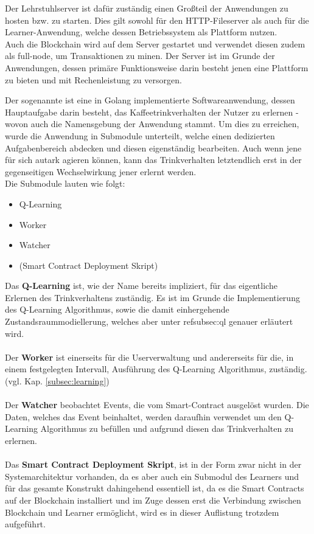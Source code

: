 Der Lehrstuhlserver ist dafür zuständig einen Großteil der Anwendungen zu hosten bzw. zu starten.
Dies gilt sowohl für den HTTP-Fileserver als auch für die Learner-Anwendung, welche dessen Betriebssystem als Plattform nutzen.\\
Auch die Blockchain wird auf dem Server gestartet und verwendet diesen zudem als full-node, um Transaktionen zu minen.
Der Server ist im Grunde der Anwendungen, dessen primäre Funktionsweise darin besteht jenen eine Plattform zu bieten und mit Rechenleistung zu versorgen.

Der sogenannte  ist eine in Golang implementierte Softwareanwendung, dessen Hauptaufgabe darin besteht, das Kaffeetrinkverhalten der Nutzer zu erlernen - wovon auch die Namensgebung der Anwendung stammt.
Um dies zu erreichen, wurde die Anwendung in Submodule unterteilt, welche einen dedizierten Aufgabenbereich abdecken und diesen eigenständig bearbeiten.
Auch wenn jene für sich autark agieren können, kann das Trinkverhalten letztendlich erst in der gegenseitigen Wechselwirkung jener erlernt werden. \\
Die Submodule lauten wie folgt:
\begin{itemize}
	\item Q-Learning
	\item Worker
	\item Watcher
	\item (Smart Contract Deployment Skript)
\end{itemize}

Das \textbf{Q-Learning} ist, wie der Name bereits impliziert, für das eigentliche Erlernen des Trinkverhaltens zuständig. Es ist im Grunde die Implementierung des Q-Learning Algorithmus, sowie die damit einhergehende Zustandsraummodiellerung, welches aber unter ref{subsec:ql} genauer erläutert wird.
\\\\
Der \textbf{Worker} ist einerseits für die Userverwaltung und andererseits für die, in einem festgelegten Intervall, Ausführung des Q-Learning Algorithmus, zuständig. (vgl. Kap. \ref{subsec:learning})
\\\\
Der \textbf{Watcher} beobachtet Events, die vom Smart-Contract  ausgelöst wurden. Die Daten, welches das Event beinhaltet, werden daraufhin verwendet um den Q-Learning Algorithmus zu befüllen und aufgrund diesen das Trinkverhalten zu erlernen.
\\\\
Das \textbf{Smart Contract Deployment Skript}, ist in der Form zwar nicht in der Systemarchitektur vorhanden, da es aber auch ein Submodul des Learners und für das gesamte Konstrukt dahingehend essentiell ist, da es die Smart Contracts auf der Blockchain installiert und im Zuge dessen erst die Verbindung zwischen Blockchain und Learner ermöglicht, wird es in dieser Auflistung trotzdem aufgeführt.


